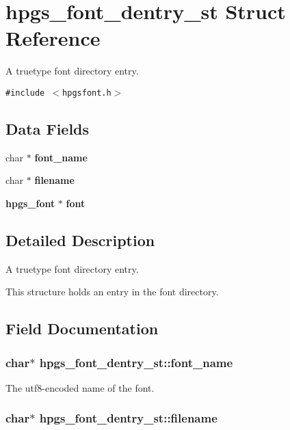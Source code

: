 \section{hpgs\_\-font\_\-dentry\_\-st Struct Reference}
\label{structhpgs__font__dentry__st}
A truetype font directory entry.  


{\tt \#include $<$hpgsfont.h$>$}

\subsection*{Data Fields}
\begin{CompactItemize}
\item 
char $\ast$ {\bf font\_\-name}
\item 
char $\ast$ {\bf filename}
\item 
{\bf hpgs\_\-font} $\ast$ {\bf font}
\end{CompactItemize}


\subsection{Detailed Description}
A truetype font directory entry. 

This structure holds an entry in the font directory. 

\subsection{Field Documentation}
\subsubsection[font\_\-name]{\setlength{\rightskip}{0pt plus 5cm}char$\ast$ {\bf hpgs\_\-font\_\-dentry\_\-st::font\_\-name}}\label{structhpgs__font__dentry__st_bbc203a7f4c4145107e1eb90f6f8a83c}


The utf8-encoded name of the font. 
\subsubsection[filename]{\setlength{\rightskip}{0pt plus 5cm}char$\ast$ {\bf hpgs\_\-font\_\-dentry\_\-st::filename}}\label{structhpgs__font__dentry__st_d3400a323f96c389c889691b594209d7}


